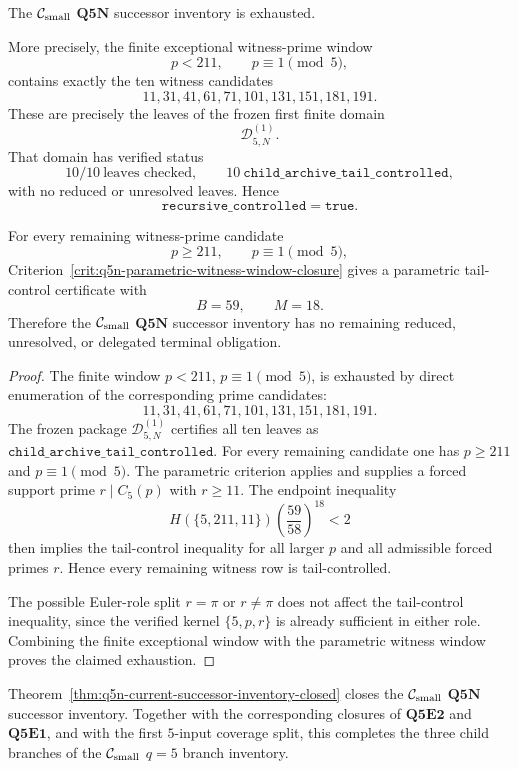 \begin{theorem}
\label{thm:q5n-current-successor-inventory-closed}
The \(\mathcal C_{\mathrm{small}}\) \(\mathbf{Q5N}\) successor inventory is exhausted.

More precisely, the finite exceptional witness-prime window
\[
  p<211,
  \qquad
  p\equiv1\pmod5,
\]
contains exactly the ten witness candidates
\[
  11,31,41,61,71,101,131,151,181,191.
\]
These are precisely the leaves of the frozen first finite domain
\[
  \mathcal D_{5,N}^{(1)}.
\]
That domain has verified status
\[
  10/10\ \text{leaves checked},
  \qquad
  10\ \mathtt{child\_archive\_tail\_controlled},
\]
with no reduced or unresolved leaves.  Hence
\[
  \mathtt{recursive\_controlled}=\mathtt{true}.
\]

For every remaining witness-prime candidate
\[
  p\ge211,
  \qquad
  p\equiv1\pmod5,
\]
Criterion~\ref{crit:q5n-parametric-witness-window-closure} gives a parametric
tail-control certificate with
\[
  B=59,
  \qquad
  M=18.
\]
Therefore the \(\mathcal C_{\mathrm{small}}\) \(\mathbf{Q5N}\) successor inventory has no remaining
reduced, unresolved, or delegated terminal obligation.
\end{theorem}

\begin{proof}
The finite window \(p<211\), \(p\equiv1\pmod5\), is exhausted by direct
enumeration of the corresponding prime candidates:
\[
  11,31,41,61,71,101,131,151,181,191.
\]
The frozen package \(\mathcal D_{5,N}^{(1)}\) certifies all ten leaves as
\(\mathtt{child\_archive\_tail\_controlled}\).  For every remaining candidate
one has \(p\ge211\) and \(p\equiv1\pmod5\).  The parametric criterion applies
and supplies a forced support prime \(r\mid C_5(p)\) with \(r\ge11\).
The endpoint inequality
\[
  H(\{5,211,11\})
  \left(\frac{59}{58}\right)^{18}<2
\]
then implies the tail-control inequality for all larger \(p\) and all admissible
forced primes \(r\).  Hence every remaining witness row is tail-controlled.

The possible Euler-role split \(r=\pi\) or \(r\ne\pi\) does not affect the
tail-control inequality, since the verified kernel \(\{5,p,r\}\) is already
sufficient in either role.  Combining the finite exceptional window with the
parametric witness window proves the claimed exhaustion.
\end{proof}

\begin{remark}
\label{rem:scope-q5n-current-successor-inventory-closed}
Theorem~\ref{thm:q5n-current-successor-inventory-closed} closes the
\(\mathcal C_{\mathrm{small}}\) \(\mathbf{Q5N}\) successor inventory.  Together with the corresponding
closures of \(\mathbf{Q5E2}\) and \(\mathbf{Q5E1}\), and with the first
\(5\)-input coverage split, this completes the three child branches of the
\(\mathcal C_{\mathrm{small}}\) \(q=5\) branch inventory.
\end{remark}

